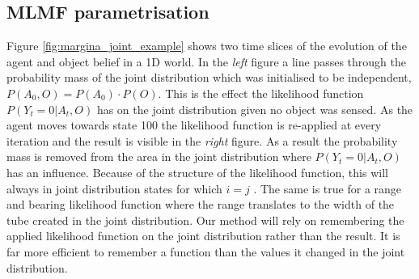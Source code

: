 \subsection{MLMF parametrisation}



Figure \ref{fig:margina_joint_example} shows two time slices of the evolution of the agent and object belief in a 1D world. In the \textit{left}
figure a line passes through the probability mass of the joint distribution which was initialised to be independent,
$P(A_0,O) = P(A_0) \cdot P(O)$. This is the effect the likelihood function $P(Y_t=0|A_t,O)$ has on the joint distribution given no object was sensed. As the agent 
moves towards state 100 the likelihood function is re-applied at every iteration and the result is visible in the \textit{right} figure. 
As a result the probability mass is removed from the area in the joint distribution where $P(Y_t=0|A_t,O)$ has an influence.
Because of the structure of the likelihood function, this will always in joint distribution states for which $i=j$ . 
The same is true for a range and bearing likelihood function where the range translates to the width of the tube created in the 
joint distribution. Our method will rely on remembering the applied likelihood function on the joint distribution rather than the result. 
It is far more efficient to remember a function than the values it changed in the
joint distribution.

